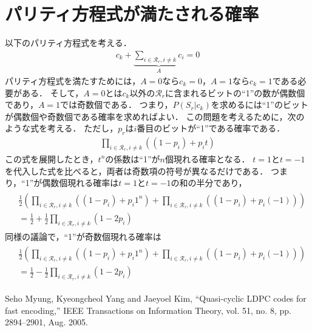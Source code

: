 \documentclass[twocolumn, a4paper]{ieicejsp}
\newcommand{\brkts}[1]{\left(#1\right)}
\begin{document}
\appendix
\section{パリティ方程式が満たされる確率} \label{appendix:parity_eq}

以下のパリティ方程式を考える．
\begin{align}
  c_k + \underbrace{\sum_{i \in \mathcal{R}_r, i\not=k} c_i}_{A} = 0
\end{align}
パリティ方程式を満たすためには，$A=0$なら$c_k=0$，$A=1$なら$c_k=1$である必要がある．
そして，$A=0$とは$c_k$以外の$\mathcal{R}_r$に含まれるビットの``1''の数が偶数個であり，$A=1$では奇数個である．
つまり，$P(S_r|c_k)$を求めるには``1''のビットが偶数個や奇数個である確率を求めればよい．
この問題を考えるために，次のような式を考える．
ただし，$p_r$は$i$番目のビットが``1''である確率である．
\begin{align}
  \prod_{i \in \mathcal{R}_r, i \not= k} ((1 - p_i) + p_i t)
\end{align}
この式を展開したとき，$t^n$の係数は``1''が$n$個現れる確率となる．
$t=1$と$t=-1$を代入した式を比べると，両者は奇数項の符号が異なるだけである．
つまり，``1''が偶数個現れる確率は$t=1$と$t=-1$の和の半分であり，
\begin{align}
  \begin{split}
    &\frac{1}{2} \brkts{\prod_{i \in \mathcal{R}_r, i \not= k} ((1 - p_i) + p_i 1^n) + \prod_{i \in \mathcal{R}_r, i \not= k} ((1 - p_i) + p_i (-1)) } \\
    &= \frac{1}{2} + \frac{1}{2}\prod_{i \in \mathcal{R}_r, i \not= k} (1 - 2p_i)
  \end{split}
\end{align}
同様の議論で，``1''が奇数個現れる確率は
\begin{align*}
  \begin{split}
    &\frac{1}{2} \brkts{\prod_{i \in \mathcal{R}_r, i \not= k} ((1 - p_i) + p_i 1^n) + \prod_{i \in \mathcal{R}_r, i \not= k} ((1 - p_i) + p_i (-1)) } \\
    &= \frac{1}{2} - \frac{1}{2}\prod_{i \in \mathcal{R}_r, i \not= k} (1 - 2p_i)
  \end{split}
\end{align*}


\begin{thebibliography}{99}
 Seho Myung, Kyeongcheol Yang and Jaeyoel Kim, ``Quasi-cyclic LDPC codes for fast encoding,'' IEEE Transactions on Information Theory, vol. 51, no. 8, pp. 2894--2901, Aug. 2005.

\end{thebibliography}
\end{document}
